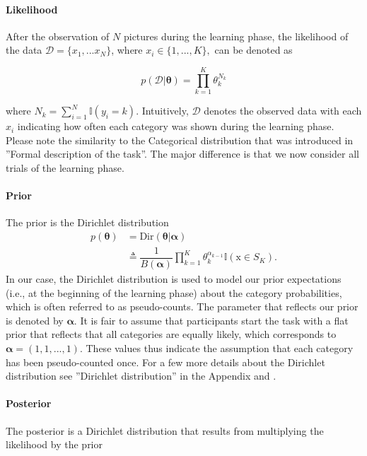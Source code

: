 \documentclass[a4paper,12pt]{article}
\begin{document}
\paragraph{Likelihood}
After the observation of $N$ pictures during the learning phase, the likelihood of the data $\boldsymbol{\mathcal{D}}=\{x_1,...x_N\}$, where $x_i \in \{1,...,K\},$ can be denoted as

\begin{equation}
p(\boldsymbol{\mathcal{D}}|\boldsymbol{\theta})= \prod^K_{k=1}\theta^{N_k}_k 
\end{equation}

where $N_k = \sum_{i=1}^{N}\mathbb{I}(y_i=k)$. Intuitively, $\boldsymbol{\mathcal{D}}$ denotes the observed data with each $x_i$ indicating how often each category was shown during the learning phase. Please note the similarity to the Categorical distribution that was introduced in ''Formal description of the task''. The major difference is that we now consider all trials of the learning phase.

\paragraph{Prior}
The prior is the Dirichlet distribution
\begin{equation}
\begin{aligned}
p(\boldsymbol{\theta}) & = \mathrm{Dir}(\boldsymbol{\theta}|\boldsymbol{\alpha})\\
&\triangleq \dfrac{1}{B(\boldsymbol{\alpha})} \prod^K_{k=1}\theta_k^{\alpha_{k-1}}\mathbb{I}(\mathrm{x}\in S_K).	
\end{aligned}
\end{equation}
In our case, the Dirichlet distribution is used to model our prior expectations (i.e., at the beginning of the learning phase) about the category probabilities, which is often referred to as pseudo-counts. The parameter that reflects our prior is denoted by $\boldsymbol{\alpha}$. It is fair to assume that participants start the task with a flat prior that reflects that all categories are equally likely, which corresponds to $\boldsymbol{\alpha} = (1,1,...,1)$. These values thus indicate the assumption that each category has been pseudo-counted once. For a few more details about the Dirichlet distribution see ''Dirichlet distribution'' in the Appendix and \cite{Murphy2012}.

\paragraph{Posterior}
The posterior is a Dirichlet distribution that results from multiplying the likelihood by the prior
\end{document}
